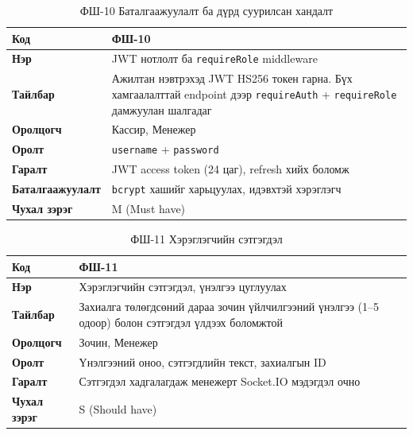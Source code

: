 \begin{table}[htbp]
\caption{ФШ-10 Баталгаажуулалт ба дүрд суурилсан хандалт}
\label{tab:fr10}
\centering
\small
\begin{tabularx}{\textwidth}{|l|L|}
\hline
{}
\textbf{Код} & ФШ-10 \\ \hline
\textbf{Нэр} & JWT нотлолт ба \texttt{requireRole} middleware \\ \hline
{}
\textbf{Тайлбар} & Ажилтан нэвтрэхэд JWT HS256 токен гарна. Бүх хамгаалалттай endpoint дээр \texttt{requireAuth} + \texttt{requireRole} дамжуулан шалгадаг \\ \hline
\textbf{Оролцогч} & Кассир, Менежер \\ \hline
{}
\textbf{Оролт} & \texttt{username} + \texttt{password} \\ \hline
\textbf{Гаралт} & JWT access token (24 цаг), refresh хийх боломж \\ \hline
{}
\textbf{Баталгаажуулалт} & \texttt{bcrypt} хашийг харьцуулах, идэвхтэй хэрэглэгч \\ \hline
\textbf{Чухал зэрэг} & M (Must have) \\ \hline
\end{tabularx}
\end{table}

\begin{table}[htbp]
\caption{ФШ-11 Хэрэглэгчийн сэтгэгдэл}
\label{tab:fr11}
\centering
\small
\begin{tabularx}{\textwidth}{|l|L|}
\hline
{}
\textbf{Код} & ФШ-11 \\ \hline
\textbf{Нэр} & Хэрэглэгчийн сэтгэгдэл, үнэлгээ цуглуулах \\ \hline
{}
\textbf{Тайлбар} & Захиалга төлөгдсөний дараа зочин үйлчилгээний үнэлгээ (1--5 одоор) болон сэтгэгдэл үлдээх боломжтой \\ \hline
\textbf{Оролцогч} & Зочин, Менежер \\ \hline
{}
\textbf{Оролт} & Үнэлгээний оноо, сэтгэгдлийн текст, захиалгын ID \\ \hline
\textbf{Гаралт} & Сэтгэгдэл хадгалагдаж менежерт Socket.IO мэдэгдэл очно \\ \hline
{}
\textbf{Чухал зэрэг} & S (Should have) \\ \hline
\end{tabularx}
\end{table}

